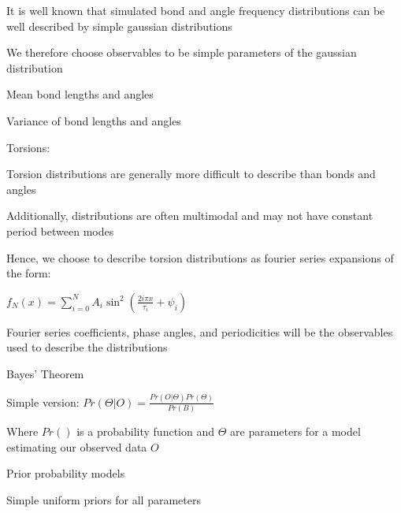 \documentclass{report}
\begin{document}
\begin{outline}
\begin{outline}
\begin{outline}
\begin{outline}
\begin{outline}
          \item{It is well known that simulated bond and angle frequency distributions can be well described by simple gaussian distributions}
          \item{We therefore choose observables to be simple parameters of the gaussian distribution}
          \begin{outline}
            \item{Mean bond lengths and angles}
            \item{Variance of bond lengths and angles}
          \end{outline}
        \end{outline}
        \item{Torsions:}
        \begin{outline}
          \item{Torsion distributions are generally more difficult to describe than bonds and angles}
          \item{Additionally, distributions are often multimodal and may not have constant period between modes}
          \item{Hence, we choose to describe torsion distributions as fourier series expansions of the form:}
          \begin{outline}
            \item{$f_{N}\left(x\right) = \sum_{i=0}^N A_i \sin^2\left(\frac{2 i \pi x}{\tau_i} + \psi_i \right)$}
            \item{Fourier series coefficients, phase angles, and periodicities will be the observables used to describe the distributions}
          \end{outline}
        \end{outline}
      \end{outline}
      \item{Bayes' Theorem}
      \begin{outline}
        \item{Simple version: $Pr\left(\Theta|O\right) = \frac{Pr\left(O|\Theta\right)Pr\left(\Theta\right)}{Pr\left(B\right)}$}
        \item{Where $Pr\left(\right)$ is a probability function and $\Theta$ are parameters for a model estimating our observed data $O$}
      \end{outline}
      \item{Prior probability models}
      \begin{outline}
        \item{Simple uniform priors for all parameters}

\end{outline}
\end{outline}
\end{outline}
\end{outline}
\end{document}
